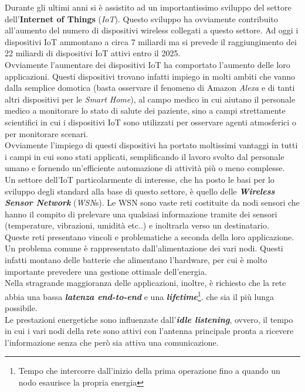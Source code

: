 Durante gli ultimi anni si è assistito ad un importantissimo sviluppo del settore dell'\textbf{Internet of Things} (\textit{IoT}). Questo sviluppo ha ovviamente contribuito all'aumento del numero di dispositivi wireless collegati a questo settore. Ad oggi i dispositivi IoT ammontano a circa 7 miliardi ma si prevede il raggiungimento dei 22 miliardi di dispositivi IoT attivi entro il 2025.\\
Ovviamente l'aumentare dei dispositivi IoT ha comportato l'aumento delle loro applicazioni. Questi dispositivi trovano infatti impiego in molti ambiti che vanno dalla semplice domotica (basta osservare il fenomeno di Amazon \textit{Alexa} e di tanti altri dispositivi per le \textit{Smart Home}), al campo medico in cui aiutano il personale medico a monitorare lo stato di salute dei paziente, sino a campi strettamente scientifici in cui i dispositivi IoT sono utilizzati per osservare agenti atmosferici o per monitorare scenari.\\

Ovviamente l'impiego di questi dispositivi ha portato moltissimi vantaggi in tutti i campi in cui sono stati applicati, semplificando il lavoro svolto dal personale umano e fornendo un'efficiente automazione di attività più o meno complesse.\\

Un settore dell'IoT particolarmente di interesse, che ha posto le basi per lo sviluppo degli standard alla base di questo settore, è quello delle \textbf{\textit{Wireless Sensor Network}} (\textit{WSN}s). Le WSN sono vaste reti costituite da nodi sensori che hanno il compito di prelevare una qualsiasi informazione tramite dei sensori (temperature, vibrazioni, umidità etc..) e inoltrarla verso un destinatario.\\
Queste reti presentano vincoli e problematiche a seconda della loro applicazione.\\
Un problema comune è rappresentato dall'alimentazione dei vari nodi. Questi infatti montano delle batterie che alimentano l'hardware, per cui è molto importante prevedere una gestione ottimale dell'energia.\\

Nella stragrande maggioranza delle applicazioni, inoltre, è richiesto che la rete abbia una bassa \textbf{\textit{latenza end-to-end}} e una \textbf{\textit{lifetime}}\footnote{Tempo che intercorre dall'inizio della prima operazione fino a quando un nodo esaurisce la propria energia}. che sia il più lunga possibile.\\
Le prestazioni energetiche sono influenzate dall'\textbf{\textit{idle listening}}, ovvero, il tempo in cui i vari nodi della rete sono attivi con l'antenna principale pronta a ricevere l'informazione senza che però sia attiva una comunicazione. \\

